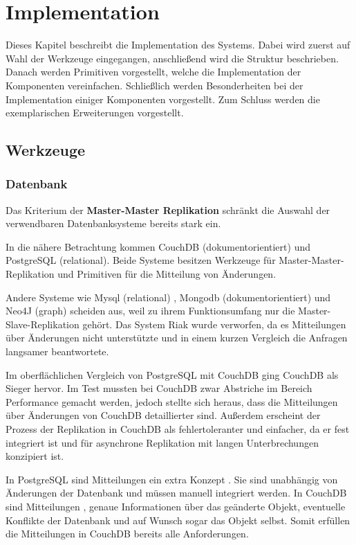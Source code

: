 \chapter{Implementation}

Dieses Kapitel beschreibt die Implementation des Systems.
Dabei wird zuerst auf Wahl der Werkzeuge eingegangen,
anschließend wird die Struktur beschrieben.
Danach werden Primitiven vorgestellt, welche die Implementation der Komponenten vereinfachen.
Schließlich werden Besonderheiten bei der Implementation einiger Komponenten vorgestellt.
Zum Schluss werden die exemplarischen Erweiterungen vorgestellt.

\section{Werkzeuge}
\subsection{Datenbank}

Das Kriterium der \textbf{Master-Master Replikation}
schränkt die Auswahl der verwendbaren Datenbanksysteme bereits stark ein.

In die nähere Betrachtung kommen CouchDB \cite{couchdb:website} (dokumentorientiert)
und PostgreSQL \cite{postgresql:website} (relational).
Beide Systeme besitzen Werkzeuge für Master-Master-Replikation
und Primitiven für die Mitteilung von Änderungen.

Andere Systeme wie Mysql (relational) \cite{mysql:website}, Mongodb (dokumentorientiert) \cite{mongodb:website}
und  Neo4J (graph) \cite{neo4j:website} scheiden aus, weil zu ihrem Funktionsumfang
nur die Master-Slave-Replikation geh\"ort.
Das System Riak \cite{riak:website} wurde verworfen, da es Mitteilungen über Änderungen nicht unterstützte und in einem kurzen Vergleich
die Anfragen langsamer beantwortete.

Im oberflächlichen Vergleich von PostgreSQL mit CouchDB ging CouchDB als Sieger hervor.
Im Test mussten bei CouchDB zwar Abstriche im Bereich Performance gemacht werden,
jedoch stellte sich heraus, dass die Mitteilungen über Änderungen von CouchDB detaillierter sind.
Außerdem erscheint der Prozess der Replikation in CouchDB als fehlertoleranter und einfacher, da er fest integriert ist und für asynchrone Replikation mit langen Unterbrechungen konzipiert ist.

In PostgreSQL sind Mitteilungen ein extra Konzept \cite{postgresql:notify}.
Sie sind unabhängig von Änderungen der Datenbank und müssen manuell integriert werden. 
In CouchDB sind Mitteilungen \cite[Chap Notifications]{couchdb:guide}, genaue Informationen
über das geänderte Objekt, eventuelle Konflikte der Datenbank
und auf Wunsch sogar das Objekt selbst. Somit erfüllen die Mitteilungen in CouchDB bereits alle Anforderungen.

